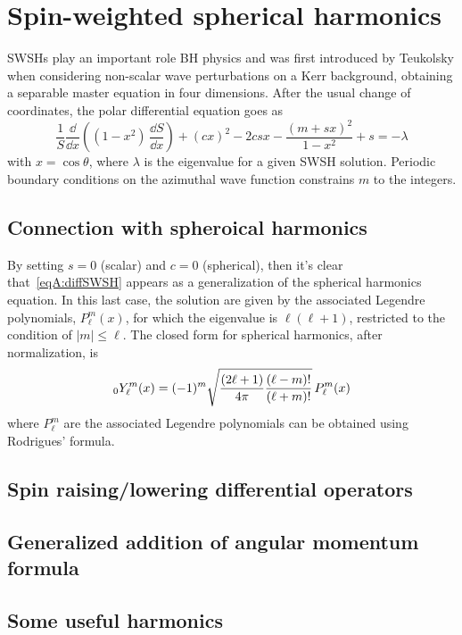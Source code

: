 
\chapter{Spin-weighted spherical harmonics}
\label{AppendixSWHs}

SWSHs play an important role BH physics and was first introduced by Teukolsky when considering non-scalar wave perturbations on a Kerr background, obtaining a separable master equation in four dimensions. After the usual change of coordinates, the polar differential equation goes as 
\begin{equation}
	\frac{1}{S} \frac{\dd}{\dd x} \left( (1-x^2) \, \frac{\dd S}{\dd x} \right) + (c x)^2 - 2 c s x  -\frac{(m + s x)^2}{1 - x^2} + s  = - \lambda
\label{eqA:diffSWSH}
\end{equation}
with $x=\cos\theta$, where $\lambda$ is the eigenvalue for a given SWSH solution. Periodic boundary conditions on the azimuthal wave function constrains $m$ to the integers.   

\section{Connection with spheroical harmonics}

By setting $s=0$ (scalar) and $c=0$ (spherical), then it's clear that~\eqref{eqA:diffSWSH} appears as a generalization of the spherical harmonics equation. In this last case, the solution are given by the associated Legendre polynomials, $P^m_\ell (x)$, for which the eigenvalue is $\ell(\ell+1)$, restricted to the condition of $|m| \le \ell$. The closed form for spherical harmonics, after normalization, is
\begin{equation}
	\uu[0]{Y^m}{\ell}(x)= (-1)^{m} \sqrt{\frac{(2\ell +1)}{4\pi} \frac{(\ell -m)!}{(\ell +m)!}} \, P_\ell^m (x)
\label{eqA:SH}
\end{equation}
where $P_{\ell}^{m}$ are the associated Legendre polynomials can be obtained using Rodrigues' formula.

\section{Spin raising/lowering differential operators}

\section{Generalized addition of angular momentum formula}

\section{Some useful harmonics}